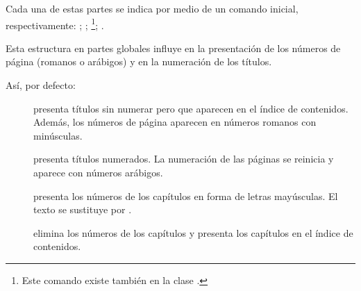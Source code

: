 Cada una de estas partes se indica por medio de un comando inicial, respectivamente: ; ; \footnote{Este comando existe también en la clase .}; .

Esta estructura en partes globales influye en la presentación de los números de página (romanos o arábigos) y en la numeración de los títulos.

Así, por defecto: \begin{description}
\item[] presenta títulos sin numerar pero que aparecen en el índice de contenidos. Además, los números de página aparecen en números romanos con minúsculas. 
\item[] presenta títulos numerados. La numeración de las páginas se reinicia y aparece con números arábigos.
\item[] presenta los números de los capítulos en forma de letras mayúsculas. El texto  se sustituye por .
\item[] elimina los números de los capítulos y presenta los capítulos en el índice de contenidos.
\end{description}

